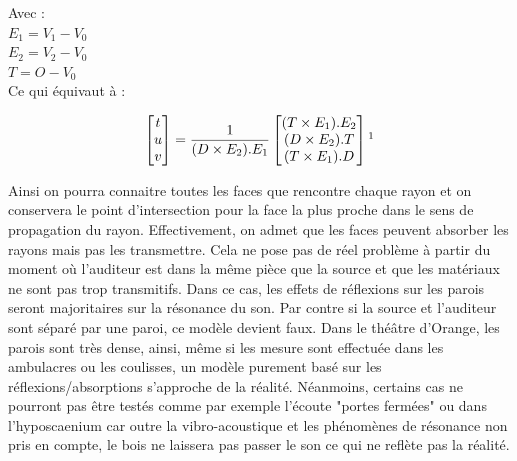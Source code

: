 Avec : \\
$E_1 =  V_1-V_0$ \\
$E_2 =  V_2-V_0$ \\
$T = O - V_0$ \\

Ce qui équivaut à : 

\begin{equation}
	\begin{bmatrix}
 	 t \\
	 u \\
	 v
	\end{bmatrix}
	=
	\frac{1}{
 	  (D \times E_2).E_1
	}
	\begin{bmatrix}
 		  (T \times E_1).E_2
 \\ 
 		  (D \times E_2).T
 \\
 		  (T \times E_1).D
	\end{bmatrix}	
	\footnotemark
\end{equation}

Ainsi on pourra connaitre toutes les faces que rencontre chaque rayon et on conservera le point d'intersection pour la face la plus proche dans le sens de propagation du rayon. Effectivement, on admet que les faces peuvent absorber les rayons mais pas les transmettre. Cela ne pose pas de réel problème à partir du moment où l'auditeur est dans la même pièce que la source et que les matériaux ne sont pas trop transmitifs. Dans ce cas, les effets de réflexions sur les parois seront majoritaires sur la résonance du son. Par contre si la source et l'auditeur sont séparé par une paroi, ce modèle devient faux. Dans le théâtre d'Orange, les parois sont très dense, ainsi, même si les mesure sont effectuée dans les \glspl{ambulacre} ou les coulisses, un modèle purement basé sur les réflexions/absorptions s'approche de la réalité. Néanmoins, certains cas ne pourront pas être testés comme par exemple l'écoute "portes fermées" ou dans l'\gls{hyposcaenium} car outre la vibro-acoustique et les phénomènes de résonance non pris en compte, le bois ne laissera pas passer le son ce qui ne reflète pas la réalité.

